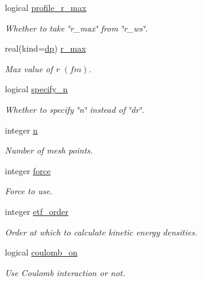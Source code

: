 \begin{DoxyCompactItemize}
logical \mbox{\hyperlink{group__INPUT__PARS_ga4f6d2343db9c28bfad5b376839f279d7}{profile\+\_\+r\+\_\+max}}
\begin{DoxyCompactList}\small\item\em Whether to take \char`\"{}r\+\_\+max\char`\"{} from \char`\"{}r\+\_\+ws\char`\"{}. \end{DoxyCompactList}\item 
real(kind=\mbox{\hyperlink{namespaceparameters_a52f8c6351fd79345d8811e065bcbbb37}{dp}}) \mbox{\hyperlink{group__INPUT__PARS_ga9372571e59a93c139d629423a9104d69}{r\+\_\+max}}
\begin{DoxyCompactList}\small\item\em Max value of r $(fm)$. \end{DoxyCompactList}\item 
logical \mbox{\hyperlink{group__INPUT__PARS_ga65180c8e25c7c66a7ef57b72282eaecf}{specify\+\_\+n}}
\begin{DoxyCompactList}\small\item\em Whether to specify \char`\"{}n\char`\"{} instead of \char`\"{}dr\char`\"{}. \end{DoxyCompactList}\item 
integer \mbox{\hyperlink{group__INPUT__PARS_ga2e69dbce49f3e83688fe80de2ce83724}{n}}
\begin{DoxyCompactList}\small\item\em Number of mesh points. \end{DoxyCompactList}\item 
integer \mbox{\hyperlink{group__INPUT__PARS_ga4f15a67f3875d8c184795f8d71ac08aa}{force}}
\begin{DoxyCompactList}\small\item\em Force to use. \end{DoxyCompactList}\item 
integer \mbox{\hyperlink{group__INPUT__PARS_ga47ccf97217bda004b76720993db73258}{etf\+\_\+order}}
\begin{DoxyCompactList}\small\item\em Order at which to calculate kinetic energy densities. \end{DoxyCompactList}\item 
logical \mbox{\hyperlink{group__INPUT__PARS_gadebedfbc56e0abdbb5f8152a34ec9654}{coulomb\+\_\+on}}
\begin{DoxyCompactList}\small\item\em Use Coulomb interaction or not. \end{DoxyCompactList}\item 

\end{DoxyCompactItemize}
